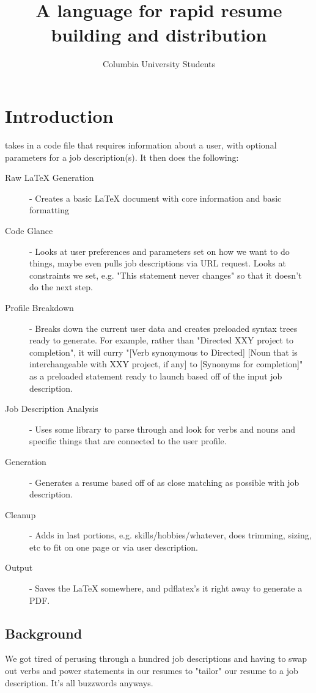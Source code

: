 \documentclass[12pt]{book}
\title{\lang\\A language for rapid resume building and distribution}
\author{Columbia University Students}
\begin{document}
\frontmatter
\maketitle
\chapter{Introduction}

\lang takes in a \lang code file that requires information about a user, with optional parameters for a job description(s). 
It then does the following:
\begin{description}
\item[Raw LaTeX Generation] - Creates a basic LaTeX document with core information and basic formatting
\item[Code Glance] - Looks at user preferences and parameters set on how we want to do things, maybe even pulls job descriptions via URL request. Looks at constraints we set, e.g. "This statement never changes" so that it doesn't do the next step.
\item[Profile Breakdown] - Breaks down the current user data and creates preloaded syntax trees ready to generate. For example, rather than "Directed XXY project to completion", it will curry "[Verb synonymous to Directed] [Noun that is interchangeable with XXY project, if any] to [Synonyms for completion]" as a preloaded statement ready to launch based off of the input job description.
\item[Job Description Analysis] - Uses some library to parse through and look for verbs and nouns and specific things that are connected to the user profile. 
\item[Generation] - Generates a resume based off of as close matching as possible with job description.
\item[Cleanup] - Adds in last portions, e.g. skills/hobbies/whatever, does trimming, sizing, etc to fit on one page or via user description.
\item[Output] - Saves the LaTeX somewhere, and pdflatex's it right away to generate a PDF.

\end{description}
	\section{Background}
		We got tired of perusing through a hundred job descriptions and having to swap out verbs and power statements in our resumes to "tailor" our resume to a job description. It's all buzzwords anyways.
\end{document}
